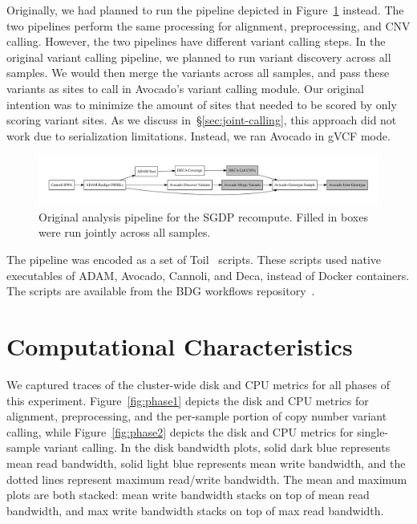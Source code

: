 \documentclass[phd]{ucbthesis}
\begin{document}
Originally, we had planned to run the pipeline depicted in
Figure~\ref{fig:original-sgdp-pipeline} instead. The two pipelines perform the
same processing for alignment, preprocessing, and CNV calling. However, the two
pipelines have different variant calling steps. In the original variant calling
pipeline, we planned to run variant discovery across all samples. We would then
merge the variants across all samples, and pass these variants as sites to call
in Avocado's variant calling module. Our original intention was to minimize the
amount of sites that needed to be scored by only scoring variant sites. As we
discuss in~\S\ref{sec:joint-calling}, this approach did not work due to
serialization limitations. Instead, we ran Avocado in gVCF mode. 

\begin{figure}[h]
  \begin{center}
    \includegraphics[width=0.95\linewidth]{graphs/pipeline-original.pdf}
  \end{center}
  \caption{Original analysis pipeline for the SGDP recompute. Filled in boxes
    were run jointly across all samples.}
  \label{fig:original-sgdp-pipeline}
\end{figure}

The pipeline was encoded as a set of Toil~\cite{vivian17} scripts. These scripts
used native executables of ADAM, Avocado, Cannoli, and Deca, instead of Docker
containers. The scripts are available from the BDG workflows
repository~\cite{workflows}.

\section{Computational Characteristics}
\label{sec:computational-characteristics}

We captured traces of the cluster-wide disk and CPU metrics for all phases of
this experiment. Figure~\ref{fig:phase1} depicts the disk and CPU metrics for
alignment, preprocessing, and the per-sample portion of copy number variant
calling, while Figure~\ref{fig:phase2} depicts the disk and CPU metrics for
single-sample variant calling. In the disk bandwidth plots, solid dark blue
represents mean read bandwidth, solid light blue represents mean write
bandwidth, and the dotted lines represent maximum read/write bandwidth. The
mean and maximum plots are both stacked: mean write bandwidth stacks on top
of mean read bandwidth, and max write bandwidth stacks on top of max read
bandwidth.
\end{document}
